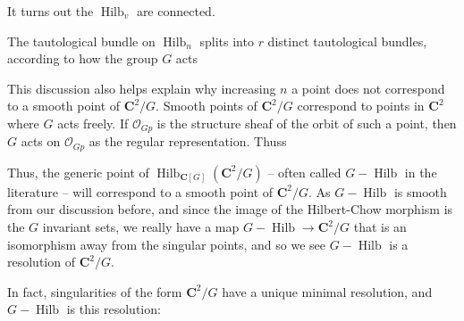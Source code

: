\documentclass{amsart}[12pt]
\theoremstyle{definition}
\newcommand{\C}{\mathbf{C}}
\DeclareMathOperator{\Hilb}{Hilb}
\begin{document}
It turns out the $\Hilb_v$ are connected.  

The tautological bundle on $\Hilb_n$ splits into $r$ distinct tautological bundles, according to how the group $G$ acts 


This discussion also helps explain why increasing $n$ a point does not correspond to a smooth point of $\C^2/G$.  Smooth points of $\C^2/G$ correspond to points in $\C^2$ where $G$ acts freely.  If $\mathcal{O}_{Gp}$ is the structure sheaf of the orbit of such a point, then $G$ acts on $\mathcal{O}_{Gp}$ as the regular representation.  Thuss

Thus, the generic point of $\Hilb_{\C[G]}({\C^2/G})$ -- often called $G-\Hilb$ in the literature -- will correspond to a smooth point of $\C^2/G$.  As $G-\Hilb$ is smooth from our discussion before, and since the image of the Hilbert-Chow morphism is the $G$ invariant sets, we really have a map $G-\Hilb\to \C^2/G$ that is an isomorphism away from the singular points, and so we see $G-\Hilb$ is a resolution of $\C^2/G$. 

\begin{center}
\end{center}

In fact, singularities of the form $\C^2/G$ have a unique minimal resolution, and $G-\Hilb$ is this resolution:
\end{document}
